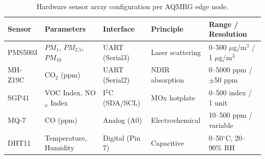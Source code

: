 \documentclass[12pt,a4paper]{article}
\begin{document}
\begin{table}[H]
\centering
\caption{Hardware sensor array configuration per AQMRG edge node.}
\label{tab:sensors}
\begin{tabular}{@{}llllp{3cm}@{}}
\toprule
\textbf{Sensor} & \textbf{Parameters} & \textbf{Interface} & \textbf{Principle} & \textbf{Range / Resolution} \\
\midrule
PMS5003 & $PM_1$, $PM_{2.5}$, $PM_{10}$ & UART (Serial3) & Laser scattering & 0--500 $\mu$g/m$^3$ / 1 $\mu$g/m$^3$ \\
MH-Z19C & CO$_2$ (ppm) & UART (Serial2) & NDIR absorption & 0--5000 ppm / $\pm$50 ppm \\
SGP41 & VOC Index, NO$_x$ Index & I$^2$C (SDA/SCL) & MOx hotplate & 0--500 index / 1 unit \\
MQ-7 & CO (ppm) & Analog (A0) & Electrochemical & 10--500 ppm / variable \\
DHT11 & Temperature, Humidity & Digital (Pin 7) & Capacitive & 0--50$^\circ$C, 20--90\% RH \\
\bottomrule
\end{tabular}
\end{table}
\end{document}
